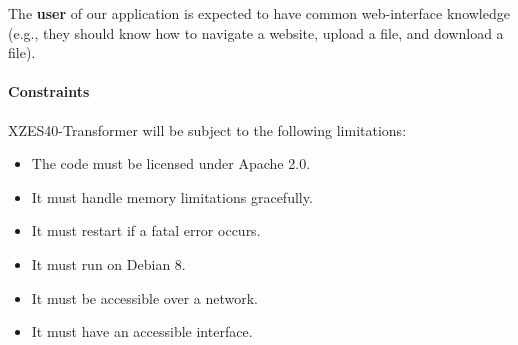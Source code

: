 The \textbf{user} of our application is expected to have common web-interface knowledge (e.g., they should know how to navigate a website, upload a file, and download a file).


\paragraph{Constraints}
% 

XZES40-Transformer will be subject to the following limitations:

\begin{itemize}
  \item The code must be licensed under Apache 2.0.
  \item It must handle memory limitations gracefully.
  \item It must restart if a fatal error occurs.
  \item It must run on Debian 8.
  \item It must be accessible over a network.
  \item It must have an accessible interface.
\end{itemize}


